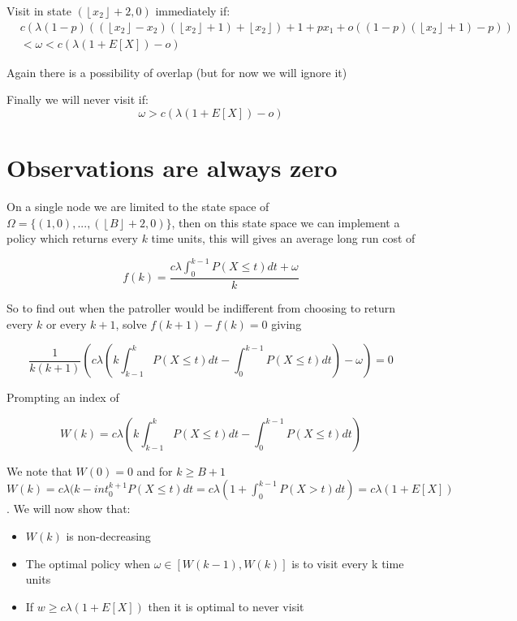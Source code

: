 \documentclass[a4paper,10pt]{article}
\newcommand{\floor}[1]{\left \lfloor #1 \right \rfloor}
\theoremstyle{definition}
\theoremstyle{definition}
\theoremstyle{remark}
\theoremstyle{definition}
\begin{document}
Visit in state $(\floor{x_{2}}+2,0)$ immediately if:
\begin{align}
&c (\lambda (1-p)((\floor{x_{2}}-x_{2})(\floor{x_{2}}+1) + \floor{x_{2}}) + 1 +px_{1} +o((1-p)(\floor{x_{2}}+1)-p)) \nonumber \\
&< \omega < c(\lambda (1+E[X])-o)
\end{align}

Again there is a possibility of overlap (but for now we will ignore it)

Finally we will never visit if:
\begin{equation}
\omega > c(\lambda (1+E[X])-o)
\end{equation}



\appendix
{}
\appendixpage
\addappheadtotoc
\section{Observations are always zero}
\label{Observations are always zero}

On a single node we are limited to the state space of $\Omega=\{ (1,0),...,(\floor{B}+2,0) \}$, then on this state space we can implement a policy which returns every $k$ time units, this will gives an average long run cost of

\begin{equation}
f(k)=\frac{c \lambda \int_{0}^{k-1} P(X \leq t) dt +\omega}{k}
\end{equation}

So to find out when the patroller would be indifferent from choosing to return every $k$ or every $k+1$, solve $f(k+1)-f(k)=0$ giving

$$\frac{1}{k(k+1)}(c \lambda (k \int_{k-1}^{k} P(X \leq t) dt - \int_{0}^{k-1} P(X \leq t) dt ) -\omega)=0 $$

Prompting an index of

$$W(k)=c \lambda (k \int_{k-1}^{k} P(X \leq t) dt - \int_{0}^{k-1} P(X \leq t) dt )$$

We note that $W(0)=0$ and for $k \geq B+1$ $W(k)=c \lambda (k - int_{0}^{k+1} P(X \leq t)dt=c \lambda (1+\int_{0}^{k-1} P(X > t)dt)=c \lambda (1+ E[X])$. We will now show that:
\begin{itemize}
\item $W(k)$ is non-decreasing
\item The optimal policy when $\omega \in [W(k-1),W(k)]$ is to visit every k time units
\item If $w \geq c \lambda (1+E[X])$ then it is optimal to never visit
\end{itemize}
\end{document}
